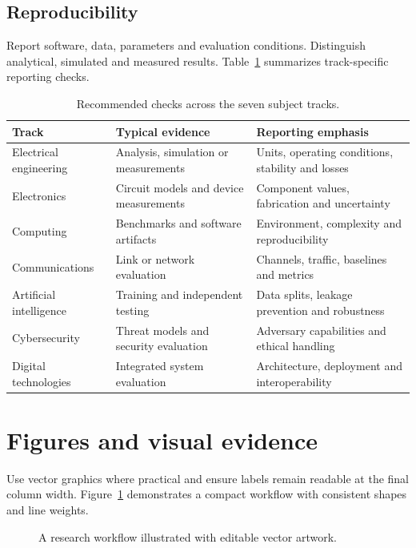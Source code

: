 \documentclass{jecde}
\begin{document}
\subsection{Reproducibility}
Report software, data, parameters and evaluation conditions. Distinguish analytical, simulated and measured results. Table~\ref{tab:tracks} summarizes track-specific reporting checks.

\begin{table}[t]
\caption{Recommended checks across the seven subject tracks.}\label{tab:tracks}
\centering\small
\begin{tabularx}{\textwidth}{@{}lXX@{}}\toprule
Track & Typical evidence & Reporting emphasis\\\midrule
Electrical engineering & Analysis, simulation or measurements & Units, operating conditions, stability and losses\\
Electronics & Circuit models and device measurements & Component values, fabrication and uncertainty\\
Computing & Benchmarks and software artifacts & Environment, complexity and reproducibility\\
Communications & Link or network evaluation & Channels, traffic, baselines and metrics\\
Artificial intelligence & Training and independent testing & Data splits, leakage prevention and robustness\\
Cybersecurity & Threat models and security evaluation & Adversary capabilities and ethical handling\\
Digital technologies & Integrated system evaluation & Architecture, deployment and interoperability\\\bottomrule
\end{tabularx}
\end{table}

\section{Figures and visual evidence}
Use vector graphics where practical and ensure labels remain readable at the final column width. Figure~\ref{fig:workflow} demonstrates a compact workflow with consistent shapes and line weights.
\begin{figure}[ht]
\centering
{}
\caption{A research workflow illustrated with editable vector artwork.}\label{fig:workflow}
\end{figure}
\end{document}
